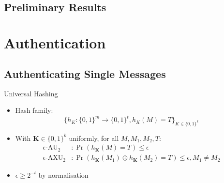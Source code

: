 \documentclass[xcolor=dvipsnames]{beamer}
\newcommand{\?}{\mathrel{?}} %
\newcommand{\rv}[1]{\boldsymbol{\mathbf{#1}}} %
\newcommand{\AU}{\mathrm{AU}_{2}}
\newcommand{\AXU}{\mathrm{AXU}_{2}}
\newcommand{\eAU}{\epsilon\text{-}\AU}
\newcommand{\eAXU}{\epsilon\text{-}\AXU}
\begin{document}
\subsection{Preliminary Results}

\section{Authentication}

\subsection{Authenticating Single Messages}

\begin{frame}{Universal Hashing}
  \begin{itemize}[<+->]
    \item Hash family:
      \[ {\{h_K : {\{0,1\}}^m \to {\{0,1\}}^t, h_K(M) = T \}}_{K \in {\{0,1\}}^k} \]
    \item With \(\rv{K} \in {\{0,1\}}^k\) uniformly, for all \(M, M_1, M_2, T\):
      \begin{align*}
        \eAU &: \Pr\left( h_{\rv{K}}(M) = T \right) \leq \epsilon \\
        \eAXU &: \Pr\left( h_{\rv{K}}(M_1) \oplus h_{\rv{K}}(M_2) = T \right) \leq \epsilon, M_1 \neq M_2
      \end{align*}
    \item \(\epsilon \geq 2^{-t}\) by normalisation
  \end{itemize}
\end{frame}
\end{document}
